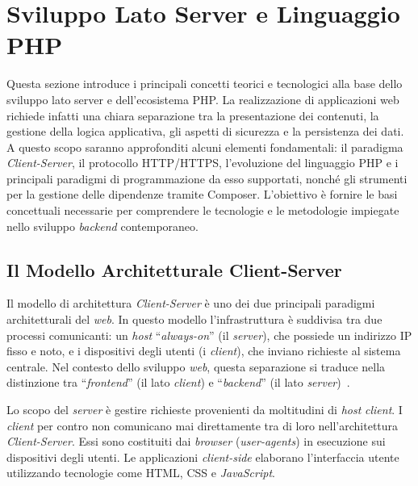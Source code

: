 \section{Sviluppo Lato Server e Linguaggio PHP}
Questa sezione introduce i principali concetti teorici e tecnologici alla base dello sviluppo lato server e dell’ecosistema PHP. La realizzazione di applicazioni web richiede infatti una chiara separazione tra la presentazione dei contenuti, la gestione della logica applicativa, gli aspetti di sicurezza e la persistenza dei dati. A questo scopo saranno approfonditi alcuni elementi fondamentali: il paradigma \textit{Client-Server}, il protocollo HTTP/HTTPS, l’evoluzione del linguaggio PHP e i principali paradigmi di programmazione da esso supportati, nonché gli strumenti per la gestione delle dipendenze tramite Composer. L’obiettivo è fornire le basi concettuali necessarie per comprendere le tecnologie e le metodologie impiegate nello sviluppo \textit{backend} contemporaneo.

\subsection{Il Modello Architetturale Client-Server}
Il modello di architettura \textit{Client-Server} è uno dei due principali paradigmi architetturali del \textit{web}. In questo modello l'infrastruttura è suddivisa tra due processi comunicanti: un \textit{host} ``\textit{always-on}'' (il \textit{server}), che possiede un indirizzo IP fisso e noto, e i dispositivi degli utenti (i \textit{client}), che inviano richieste al sistema centrale. Nel contesto dello sviluppo \textit{web}, questa separazione si traduce nella distinzione tra ``\textit{frontend}'' (il lato \textit{client}) e ``\textit{backend}'' (il lato \textit{server})~\autocite[ch. 2.1]{kuroseComputerNetworkingTopdown2021}.

Lo scopo del \textit{server} è gestire richieste provenienti da moltitudini di \textit{host} \textit{client}. I \textit{client} per contro non comunicano mai direttamente tra di loro nell’architettura \textit{Client-Server}.
Essi sono costituiti dai \textit{browser} (\textit{user-agents}) in esecuzione sui dispositivi degli utenti. Le applicazioni \textit{client-side} elaborano l'interfaccia utente utilizzando tecnologie come HTML, CSS e \textit{JavaScript}. 

